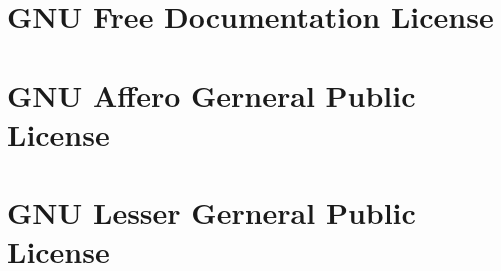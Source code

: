 \pagebreak
\section{GNU Free Documentation License}
    \label{fdl}
    

\pagebreak
\section{GNU Affero Gerneral Public License}
    \label{agpl}
    

\pagebreak
\section{GNU Lesser Gerneral Public License}
    \label{lgpl}
    
